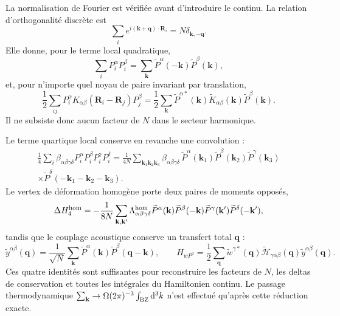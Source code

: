 La normalisation de Fourier est vérifiée avant d'introduire le continu. La
relation d'orthogonalité discrète est
\begin{equation}
\sum_i e^{i(\mathbf k+\mathbf q)\cdot\mathbf R_i}
=N\delta_{\mathbf k,-\mathbf q}.
\label{eq:core_discrete_orthogonality}
\end{equation}
Elle donne, pour le terme local quadratique,
\begin{equation}
\sum_iP_i^\alpha P_i^\beta
=\sum_{\mathbf k}
\widetilde P^\alpha(-\mathbf k)\widetilde P^\beta(\mathbf k),
\label{eq:core_fourier_local_quadratic}
\end{equation}
et, pour n'importe quel noyau de paire invariant par translation,
\begin{equation}
\frac12\sum_{ij}P_i^\alpha
K_{\alpha\beta}(\mathbf R_i-\mathbf R_j)P_j^\beta
=\frac12\sum_{\mathbf k}
\widetilde P^{\alpha *}(\mathbf k)
\widetilde K_{\alpha\beta}(\mathbf k)
\widetilde P^\beta(\mathbf k).
\label{eq:core_fourier_pair_kernel}
\end{equation}
Il ne subsiste donc aucun facteur de $N$ dans le secteur harmonique.

Le terme quartique local conserve en revanche une convolution :
\begin{equation}
\begin{aligned}
\frac14\sum_i\beta_{\alpha\beta\gamma\delta}
P_i^\alpha P_i^\beta P_i^\gamma P_i^\delta
=\frac{1}{4N}\sum_{\mathbf k_1\mathbf k_2\mathbf k_3}
\beta_{\alpha\beta\gamma\delta}\,
\widetilde P^\alpha(\mathbf k_1)
\widetilde P^\beta(\mathbf k_2)
\widetilde P^\gamma(\mathbf k_3)\\
\times\widetilde P^\delta(
-\mathbf k_1-\mathbf k_2-\mathbf k_3).
\end{aligned}
\label{eq:core_fourier_local_quartic}
\end{equation}
Le vertex de déformation homogène porte deux paires de moments opposés,
\begin{equation}
\Delta H_4^{\rm hom}
=-\frac{1}{8N}
\sum_{\mathbf k,\mathbf k'}
\Lambda^{\rm hom}_{\alpha\beta\gamma\delta}
\widetilde P^\alpha(\mathbf k)
\widetilde P^\beta(-\mathbf k)
\widetilde P^\gamma(\mathbf k')
\widetilde P^\delta(-\mathbf k'),
\label{eq:core_fourier_homogeneous_vertex}
\end{equation}
tandis que le couplage acoustique conserve un transfert total
$\mathbf q$ :
\begin{equation}
\widetilde y^{\alpha\beta}(\mathbf q)
=\frac1{\sqrt N}\sum_{\mathbf k}
\widetilde P^\alpha(\mathbf k)
\widetilde P^\beta(\mathbf q-\mathbf k),
\qquad
H_{wP^2}=\frac12\sum_{\mathbf q}
\widetilde w^{\gamma *}(\mathbf q)
\widetilde{\mathcal H}_{\gamma\alpha\beta}(\mathbf q)
\widetilde y^{\alpha\beta}(\mathbf q).
\label{eq:core_fourier_acoustic_convolution}
\end{equation}
Ces quatre identités sont suffisantes pour reconstruire les facteurs de
$N$, les deltas de conservation et toutes les intégrales du Hamiltonien
continu. Le passage thermodynamique
$\sum_{\mathbf k}\to\Omega(2\pi)^{-3}\int_{\rm BZ}\mathrm d^3k$
n'est effectué qu'après cette réduction exacte.

